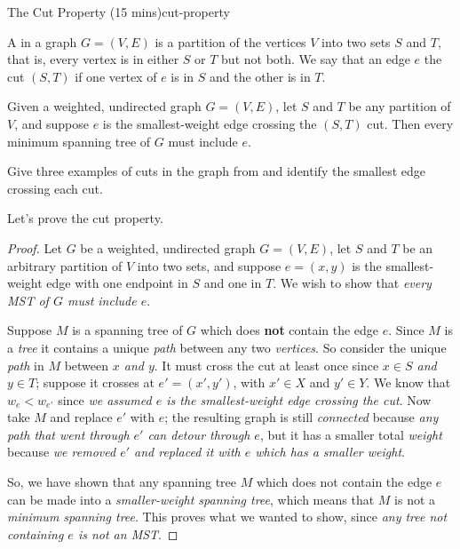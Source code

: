 
\newpage
\begin{model*}{The Cut Property (15 mins)}{cut-property}
  \begin{defn}
    A  in a graph $G = (V,E)$ is a partition of the vertices
    $V$ into two sets $S$ and $T$, that is, every vertex is in either
    $S$ or $T$ but not both.  We say that an edge $e$ 
    the cut $(S,T)$ if one vertex of $e$ is in $S$ and the other is in
    $T$.
  \end{defn}

  \begin{thm}
    Given a weighted, undirected graph $G = (V,E)$, let $S$ and $T$ be
    any partition of $V$, and suppose $e$ is the smallest-weight edge
    crossing the $(S,T)$ cut.  Then every minimum spanning tree of $G$
    must include $e$.
  \end{thm}
\end{model*}

\begin{questions}
\item Give three examples of cuts in the graph from 
  and identify the smallest edge crossing each cut.
\end{questions}

Let's prove the cut property.

\begin{proof}
  Let $G$ be a weighted, undirected graph $G = (V,E)$, let $S$ and $T$
  be an arbitrary partition of $V$ into two sets, and suppose
  $e = (x,y)$ is the smallest-weight edge with one endpoint in $S$ and
  one in $T$.  We wish to show that \emph{every MST of $G$ must
    include $e$}.

  Suppose $M$ is a spanning tree of $G$ which does \textbf{not}
  contain the edge $e$.  Since $M$ is a \emph{tree} it contains a unique
  \emph{path} between any two \emph{vertices}. So consider the unique
  \emph{path} in $M$ between \emph{$x$ and $y$}.   It must cross
  the cut at least once since \emph{$x \in S$ and $y \in T$}; suppose it
  crosses at $e' = (x',y')$, with $x' \in X$ and $y' \in Y$.
  We know that $w_e < w_{e'}$ since \emph{we assumed $e$ is the
    smallest-weight edge crossing the cut}. Now take $M$ and
  replace $e'$ with $e$; the resulting graph is still
  \emph{connected} because \emph{any path that went through $e'$ can
    detour through $e$}, but it has a smaller total \emph{weight}
  because \emph{we removed $e'$ and replaced it with $e$ which has a
    smaller weight}.

  So, we have shown that any spanning tree $M$ which does not contain
  the edge $e$ can be made into a \emph{smaller-weight spanning tree},
  which means that $M$ is not a \emph{minimum spanning tree}. This
  proves what we wanted to show, since \emph{any tree not containing
    $e$ is not an MST}.
\end{proof}

